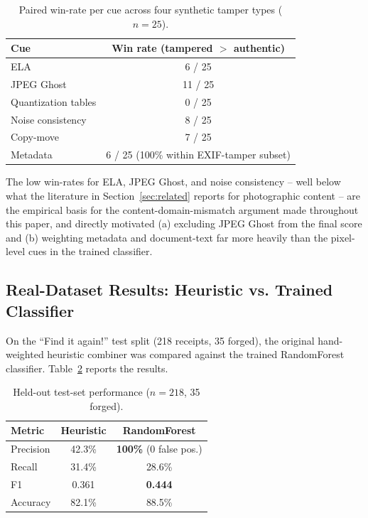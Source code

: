 \documentclass[conference]{IEEEtran}
\begin{document}
\begin{table}[t]
\centering
\caption{Paired win-rate per cue across four synthetic tamper types ($n=25$).}
\label{tab:calibration}
\small
\begin{tabular}{@{}lc@{}}
\toprule
\textbf{Cue} & \textbf{Win rate (tampered $>$ authentic)} \\
\midrule
ELA & 6 / 25 \\
JPEG Ghost & 11 / 25 \\
Quantization tables & 0 / 25 \\
Noise consistency & 8 / 25 \\
Copy-move & 7 / 25 \\
Metadata & 6 / 25 (100\% within EXIF-tamper subset) \\
\bottomrule
\end{tabular}
\end{table}

The low win-rates for ELA, JPEG Ghost, and noise consistency -- well below
what the literature in Section~\ref{sec:related} reports for photographic
content -- are the empirical basis for the content-domain-mismatch argument
made throughout this paper, and directly motivated (a) excluding JPEG Ghost
from the final score and (b) weighting metadata and document-text far more
heavily than the pixel-level cues in the trained classifier.

\subsection{Real-Dataset Results: Heuristic vs. Trained Classifier}
On the ``Find it again!'' test split (218 receipts, 35 forged), the original
hand-weighted heuristic combiner was compared against the trained
RandomForest classifier. Table~\ref{tab:results} reports the results.

\begin{table}[t]
\centering
\caption{Held-out test-set performance ($n=218$, 35 forged).}
\label{tab:results}
\small
\begin{tabular}{@{}lcc@{}}
\toprule
\textbf{Metric} & \textbf{Heuristic} & \textbf{RandomForest} \\
\midrule
Precision & 42.3\% & \textbf{100\%} (0 false pos.) \\
Recall & 31.4\% & 28.6\% \\
F1 & 0.361 & \textbf{0.444} \\
Accuracy & 82.1\% & 88.5\% \\
\bottomrule
\end{tabular}
\end{table}
\end{document}
